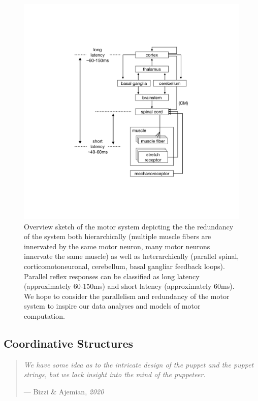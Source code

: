 \documentclass[
  a4paper,
]{article}
\begin{document}
\begin{figure}
\hypertarget{fig:motor_system}{%
\centering
\includegraphics[width=1\textwidth,height=\textheight]{images/physiology/motor_system/motor_system.pdf}
\caption{Overview sketch of the motor system depicting the the
redundancy of the system both hierarchically (multiple muscle fibers are
innervated by the same motor neuron, many motor neurons innervate the
same muscle) as well as heterarchically (parallel spinal,
corticomotoneuronal, cerebellum, basal gangliar feedback loops).
Parallel reflex responses can be classified as long latency
(approximately 60-150ms) and short latency (approximately 60ms). We hope
to consider the parallelism and redundancy of the motor system to
inspire our data analyses and models of motor
computation.}\label{fig:motor_system}
}
\end{figure}

\hypertarget{coordinative-structures}{%
\subsection{Coordinative Structures}\label{coordinative-structures}}

\begin{quote}
\emph{We have some idea as to the intricate design of the puppet and the
puppet strings, but we lack insight into the mind of the puppeteer.}

--- Bizzi \& Ajemian, \emph{2020}
\end{quote}
\end{document}
